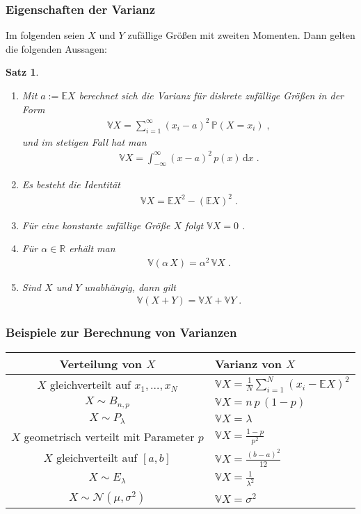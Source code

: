 \documentclass[ngerman,draft,parskip=half,twoside]{scrartcl}
\newtheorem{thm}{Satz}[section]
\newcommand*{\R}{\mathbb{R}}      %
\newcommand*{\E}{\mathbb{E}}        %
\newcommand*{\V}{\mathbb{V}}        %
\newcommand*{\WKM}{\mathbb{P}}      %
\begin{document}
\subsubsection{Eigenschaften der Varianz}
Im folgenden seien $X$ und $Y$ zufällige Größen mit zweiten Momenten. Dann gelten die
folgenden Aussagen:
\begin{thm}~
\begin{enumerate}
\item
Mit $a:=\E X$ berechnet sich die Varianz für diskrete zufällige Größen in der Form
  \begin{gather*}
    \V X = \sum_{i=1}^\infty (x_i-a)^2\,\WKM(X=x_i)\;,
  \end{gather*}
und im stetigen Fall hat man
  \begin{gather*}
    \V X =\int_{-\infty}^\infty (x-a)^2\,p(x)\,\mathrm d x\;.
  \end{gather*}
\item
Es besteht die Identität
  \begin{gather*}
    \V X = \E X^2 -(\E X)^2\;.
  \end{gather*}
\item
Für eine konstante zufällige Größe $X$ folgt $\V X=0$ .
\item
Für $\alpha\in\R$ erhält man
  \begin{gather*}
    \V(\alpha\,X)=\alpha^2\,\V X\;.
  \end{gather*}
\item
Sind $X$ und $Y$ unabhängig, dann gilt
  \begin{gather*}
    \V(X+Y)=\V X + \V Y\;.
  \end{gather*}
\end{enumerate}

\end{thm}
\subsubsection{Beispiele zur Berechnung von Varianzen}

\medskip

{\renewcommand{\arraystretch}{1.4}
\begin{center}
\begin{tabular}{|c|l|}\hline
\bf Verteilung von $X$& \bf Varianz von $X$\\ \hline\hline
$X$ gleichverteilt auf $x_1,\ldots,x_N$& $\V X=\frac{1}{N}\sum_{i=1}^N (x_i-\E X)^2$\\ \hline
$X\sim B_{n,p}$& $\V X= n\,p\,(1-p)$\\ \hline
$X\sim P_\lambda$&$\V X= \lambda$\\ \hline
$X$ geometrisch verteilt mit Parameter $p$& $\V X = \frac{1-p}{p^2}$\\ \hline
$X$ gleichverteilt auf $[a,b]$& $\V X= \frac{(b-a)^2}{12}$\\ \hline
$X\sim E_\lambda$& $\V X = \frac{1}{\lambda^2}$\\ \hline
$X\sim \mathcal N(\mu,\sigma^2)$&$ \V X = \sigma^2$\\ \hline
\end{tabular}
\end{center}
}
\end{document}

